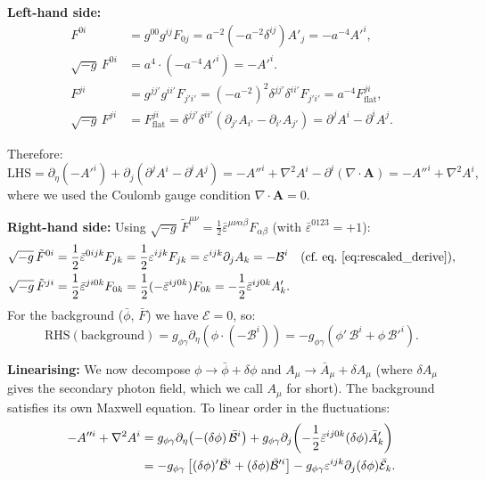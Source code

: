 \documentclass[12pt,a4paper]{report}
\newcommand{\gag}{g_{\phi\gamma}}
\renewcommand{\vec}[1]{\boldsymbol{#1}}
\theoremstyle{definition}
\begin{document}
\textbf{Left-hand side:}
\begin{align}
  F^{0i} &= g^{00}g^{ij}F_{0j} = a^{-2}(-a^{-2}\delta^{ij})A'_j = -a^{-4}A'^i,\\
  \sqrt{-g}\,F^{0i} &= a^4\cdot(-a^{-4}A'^i) = -A'^i.\\[4pt]
  F^{ji} &= g^{jj'}g^{ii'}F_{j'i'} = (-a^{-2})^2\delta^{jj'}\delta^{ii'}F_{j'i'}
           = a^{-4}F^{ji}_{\mathrm{flat}},\\
  \sqrt{-g}\,F^{ji} &= F^{ji}_{\mathrm{flat}} = \delta^{jj'}\delta^{ii'}(\partial_{j'}A_{i'}-\partial_{i'}A_{j'})
                     = \partial^j A^i - \partial^i A^j.
\end{align}

Therefore:
\begin{equation}
  \text{LHS} = \partial_\eta(-A'^i) + \partial_j(\partial^j A^i - \partial^i A^j)
             = -A''^i + \nabla^2 A^i - \partial^i(\nabla\cdot\vec{A}) = -A''^i+\nabla^2 A^i,
\end{equation}
where we used the Coulomb gauge condition $\nabla\cdot\vec{A}=0$.

\textbf{Right-hand side:}
Using $\sqrt{-g}\,\tilde F^{\mu\nu}=\frac{1}{2}\bar\varepsilon^{\mu\nu\alpha\beta}F_{\alpha\beta}$
(with $\bar\varepsilon^{0123}=+1$):
\begin{align}
  \sqrt{-g}\,\tilde F^{0i} &= \frac{1}{2}\bar\varepsilon^{0ijk}F_{jk}
    = \frac{1}{2}\varepsilon^{ijk}F_{jk} = \varepsilon^{ijk}\partial_j A_k = -\mathcal{B}^i
    \quad(\text{cf.\ eq.~}\eqref{eq:rescaled_derive}),\\
  \sqrt{-g}\,\tilde F^{ji} &= \frac{1}{2}\bar\varepsilon^{ji0k}F_{0k}
    = \frac{1}{2}(-\bar\varepsilon^{ij0k})F_{0k}
    = -\frac{1}{2}\bar\varepsilon^{ij0k}A'_k.
\end{align}
For the background ($\bar\phi$, $\bar F$) we have $\mathcal{E}=0$, so:
\begin{equation}
  \text{RHS}(\text{background}) = \gag\partial_\eta(\phi\cdot(-\mathcal{B}^i))
    = -\gag(\phi'\,\mathcal{B}^i + \phi\,\mathcal{B}'^i).
\end{equation}

\textbf{Linearising:} We now decompose $\phi\to\bar\phi+\delta\phi$ and
$A_\mu\to\bar A_\mu+\delta A_\mu$ (where $\delta A_\mu$ gives the secondary photon field,
which we call $A_\mu$ for short). The background satisfies its own Maxwell equation.
To linear order in the fluctuations:
\begin{align}
  -A''^i + \nabla^2 A^i
  &= \gag\partial_\eta\!\left(-(\delta\phi)\,\bar{\mathcal{B}}^i\right)
    + \gag\partial_j\!\left(-\frac{1}{2}\bar\varepsilon^{ij0k}(\delta\phi)\bar A'_k\right)\notag\\
  &= -\gag\left[(\delta\phi)'\bar{\mathcal{B}}^i
    + (\delta\phi)\bar{\mathcal{B}}'^i\right]
    - \gag\varepsilon^{ijk}\partial_j(\delta\phi)\bar{\mathcal{E}}_k.
  \label{eq:EOM_before_simplify}
\end{align}
\end{document}
